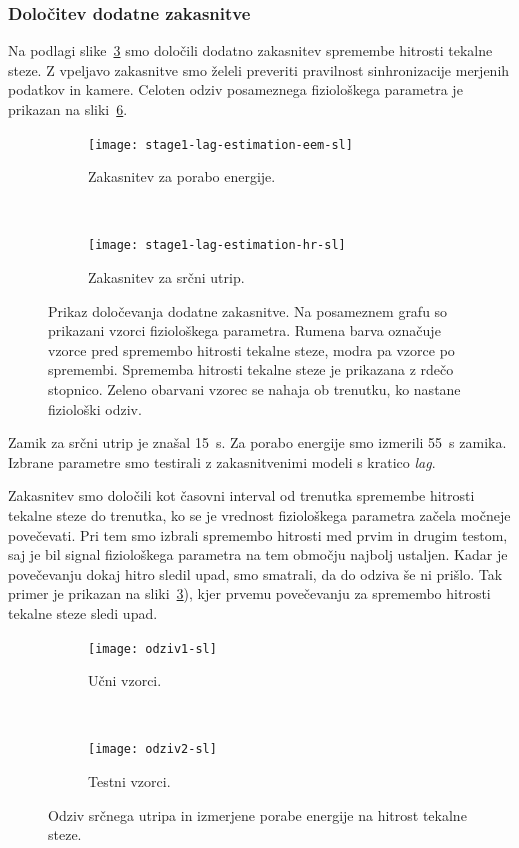 \subsubsection{Določitev dodatne zakasnitve}
Na podlagi slike~\ref{fig:lag-estimation-stage1} smo določili dodatno zakasnitev spremembe hitrosti tekalne steze. Z vpeljavo zakasnitve smo želeli preveriti pravilnost sinhronizacije merjenih podatkov in kamere. Celoten odziv posameznega fiziološkega parametra je prikazan na sliki~\ref{fig:odziv-stage1}.


\begin{figure}[!htb]
	\centering
	\begin{subfigure}[t]{0.45\columnwidth}
		\texttt{[image: stage1-lag-estimation-eem-sl]}
		\caption{Zakasnitev za porabo energije.}
		\label{fig:lag-estimation-train-eem}
	\end{subfigure}
	~
	\begin{subfigure}[t]{0.45\columnwidth}
		\texttt{[image: stage1-lag-estimation-hr-sl]}
		\caption{Zakasnitev za srčni utrip.}
		\label{fig:lag-estimation-train-hr}
	\end{subfigure}
	\caption[Prikaz določevanja dodatne zakasnitve]{Prikaz določevanja dodatne zakasnitve. Na posameznem grafu so prikazani vzorci fiziološkega parametra. Rumena barva označuje vzorce pred spremembo hitrosti tekalne steze, modra pa vzorce po spremembi. Sprememba hitrosti tekalne steze je prikazana z rdečo stopnico. Zeleno obarvani vzorec se nahaja ob trenutku, ko nastane fiziološki odziv.}
	\label{fig:lag-estimation-stage1}
\end{figure}

Zamik za srčni utrip je znašal \SI{15}{\s}. Za porabo energije smo izmerili \SI{55}{\s} zamika. Izbrane parametre smo testirali z zakasnitvenimi modeli s kratico \textit{lag}.

Zakasnitev smo določili kot časovni interval od trenutka spremembe hitrosti tekalne steze do trenutka, ko se je vrednost fiziološkega parametra začela močneje povečevati. Pri tem smo izbrali spremembo hitrosti med prvim in drugim testom, saj je bil signal fiziološkega parametra na tem območju najbolj ustaljen. Kadar je povečevanju dokaj hitro sledil upad, smo smatrali, da do odziva še ni prišlo. Tak primer je prikazan na sliki~\ref{fig:lag-estimation-stage1}), kjer prvemu povečevanju za spremembo hitrosti tekalne steze sledi upad. 


\begin{figure}[!htb]
	\centering
	\begin{subfigure}[t]{0.45\columnwidth}
		\texttt{[image: odziv1-sl]}
		\caption{Učni vzorci.}
		\label{fig:odziv-ucnih-stage1}
	\end{subfigure}
	~
	\begin{subfigure}[t]{0.45\columnwidth}
		\texttt{[image: odziv2-sl]}
		\caption{Testni vzorci.}
		\label{fig:odziv-testnih-stage1}
	\end{subfigure}
	\caption[Odziv srčnega utripa in izmerjene porabe energije na hitrost tekalne steze]{Odziv srčnega utripa in izmerjene porabe energije na hitrost tekalne steze.}
	\label{fig:odziv-stage1}
\end{figure} 


